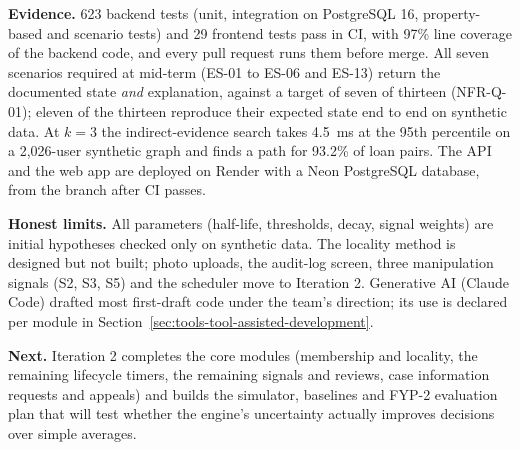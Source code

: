 \textbf{Evidence.} 623 backend tests (unit, integration on PostgreSQL 16, property-based and scenario tests) and 29 frontend tests pass in CI, with 97\% line coverage of the backend code, and every pull request runs them before merge. All seven scenarios required at mid-term (ES-01 to ES-06 and ES-13) return the documented state \textit{and} explanation, against a target of seven of thirteen (NFR-Q-01); eleven of the thirteen reproduce their expected state end to end on synthetic data. At $k=3$ the indirect-evidence search takes 4.5~ms at the 95th percentile on a 2,026-user synthetic graph and finds a path for 93.2\% of loan pairs. The API and the web app are deployed on Render with a Neon PostgreSQL database, from the  branch after CI passes.

\textbf{Honest limits.} All parameters (half-life, thresholds, decay, signal weights) are initial hypotheses checked only on synthetic data. The locality method is designed but not built; photo uploads, the audit-log screen, three manipulation signals (S2, S3, S5) and the scheduler move to Iteration 2. Generative AI (Claude Code) drafted most first-draft code under the team's direction; its use is declared per module in Section~\ref{sec:tools-tool-assisted-development}.

\textbf{Next.} Iteration 2 completes the core modules (membership and locality, the remaining lifecycle timers, the remaining signals and reviews, case information requests and appeals) and builds the simulator, baselines and FYP-2 evaluation plan that will test whether the engine's uncertainty actually improves decisions over simple averages.
